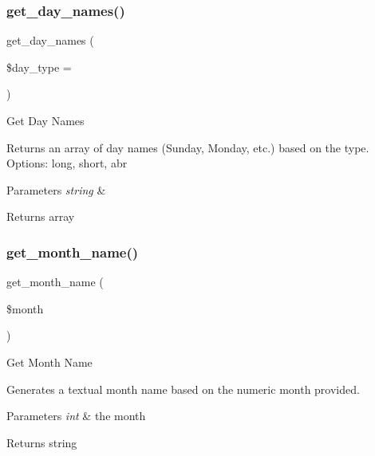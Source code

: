 \subsubsection{\texorpdfstring{get\+\_\+day\+\_\+names()}{get\_day\_names()}}
{\footnotesize\ttfamily get\+\_\+day\+\_\+names (\begin{DoxyParamCaption}\item[{}]{\$day\+\_\+type = {\ttfamily \textquotesingle{}\textquotesingle{}} }\end{DoxyParamCaption})}

Get Day Names

Returns an array of day names (Sunday, Monday, etc.) based on the type. Options\+: long, short, abr


\begin{DoxyParams}{Parameters}
{\em string} & \\
\hline
\end{DoxyParams}
\begin{DoxyReturn}{Returns}
array 
\end{DoxyReturn}
\mbox{\label{class_c_i___calendar_a056208e620b0ffc2525a07d8646eb194}} 
\subsubsection{\texorpdfstring{get\+\_\+month\+\_\+name()}{get\_month\_name()}}
{\footnotesize\ttfamily get\+\_\+month\+\_\+name (\begin{DoxyParamCaption}\item[{}]{\$month }\end{DoxyParamCaption})}

Get Month Name

Generates a textual month name based on the numeric month provided.


\begin{DoxyParams}{Parameters}
{\em int} & the month \\
\hline
\end{DoxyParams}
\begin{DoxyReturn}{Returns}
string 
\end{DoxyReturn}
\mbox{\label{class_c_i___calendar_a3c863f62907e445af2711df11fb90ff9}} 
